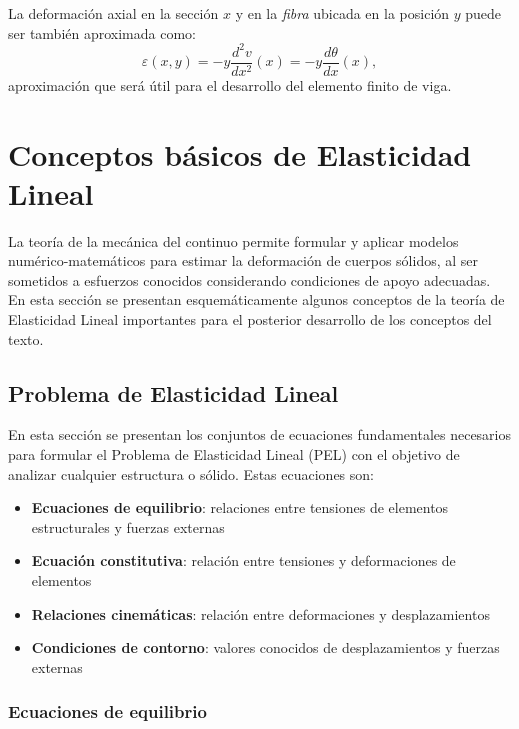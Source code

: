La deformación axial en la sección $x$ y en la \textit{fibra} ubicada en la posición $y$ puede ser también aproximada como:
\begin{equation}\label{eqn:epstimo}
\boxed{
	\varepsilon(x,y) = -y \frac{d^2 v}{d x^2} (x) = -y \frac{d \theta}{d x} (x),
}
\end{equation}
%
aproximación que será útil para el desarrollo del elemento finito de viga.




\section{Conceptos básicos de Elasticidad Lineal}

La teoría de la mecánica del continuo permite formular y aplicar modelos numérico-matemáticos para estimar la deformación de cuerpos sólidos, al ser sometidos a esfuerzos conocidos considerando condiciones de apoyo adecuadas. %
%
En esta sección se presentan esquemáticamente algunos conceptos de la teoría de Elasticidad Lineal importantes para el posterior desarrollo de los conceptos del texto.


\subsection{Problema de Elasticidad Lineal}

En esta sección se presentan los conjuntos de ecuaciones fundamentales necesarios para formular el Problema de Elasticidad Lineal (PEL) con el objetivo de analizar cualquier estructura o sólido. Estas ecuaciones son:
\begin{itemize}
\item \textbf{Ecuaciones de equilibrio}: relaciones entre  tensiones de elementos estructurales y fuerzas externas
\item \textbf{Ecuación constitutiva}: relación entre tensiones y deformaciones de elementos
\item \textbf{Relaciones cinemáticas}: relación entre deformaciones y desplazamientos
\item \textbf{Condiciones de contorno}: valores conocidos de desplazamientos y fuerzas externas
\end{itemize}

\subsubsection*{Ecuaciones de equilibrio}

